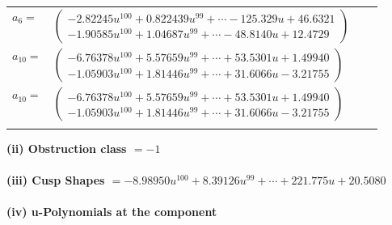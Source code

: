 \documentclass[1p]{elsarticle_modified}
\theoremstyle{definition}
\begin{document}
\begin{tabular}{m{7pt} m{180pt} m{7pt} m{180pt} }
\flushright $a_{6}=$&$\begin{pmatrix}-2.82245 u^{100}+0.822439 u^{99}+\cdots-125.329 u+46.6321\\-1.90585 u^{100}+1.04687 u^{99}+\cdots-48.8140 u+12.4729\end{pmatrix}$ \\
\flushright $a_{10}=$&$\begin{pmatrix}-6.76378 u^{100}+5.57659 u^{99}+\cdots+53.5301 u+1.49940\\-1.05903 u^{100}+1.81446 u^{99}+\cdots+31.6066 u-3.21755\end{pmatrix}$\\ \flushright $a_{10}=$&$\begin{pmatrix}-6.76378 u^{100}+5.57659 u^{99}+\cdots+53.5301 u+1.49940\\-1.05903 u^{100}+1.81446 u^{99}+\cdots+31.6066 u-3.21755\end{pmatrix}$\\&\end{tabular}
\flushleft \textbf{(ii) Obstruction class $= -1$}\\~\\
\flushleft \textbf{(iii) Cusp Shapes $= -8.98950 u^{100}+8.39126 u^{99}+\cdots+221.775 u+20.5080$}\\~\\
\newpage\renewcommand{\arraystretch}{1}
\flushleft \textbf{(iv) u-Polynomials at the component}\newline \\
\end{document}
